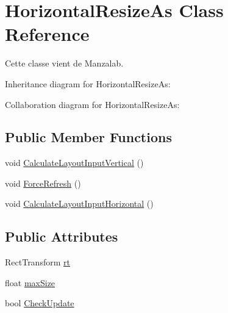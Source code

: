 \hypertarget{class_horizontal_resize_as}{}\section{Horizontal\+Resize\+As Class Reference}
\label{class_horizontal_resize_as}


Cette classe vient de Manzalab.  




Inheritance diagram for Horizontal\+Resize\+As\+:


Collaboration diagram for Horizontal\+Resize\+As\+:
\subsection*{Public Member Functions}
\begin{DoxyCompactItemize}
\item 
void \hyperlink{class_horizontal_resize_as_aaaa4fee66259a708c39d0dfed83be011}{Calculate\+Layout\+Input\+Vertical} ()
\item 
void \hyperlink{class_horizontal_resize_as_a1ffc4557eaffeea58548435876a0a0b5}{Force\+Refresh} ()
\item 
void \hyperlink{class_horizontal_resize_as_aad66debc7373d6813f95448b92acbc80}{Calculate\+Layout\+Input\+Horizontal} ()
\end{DoxyCompactItemize}
\subsection*{Public Attributes}
\begin{DoxyCompactItemize}
\item 
Rect\+Transform \hyperlink{class_horizontal_resize_as_a0a1a352352274ba0e244aeee3fc5b3bc}{rt}
\item 
float \hyperlink{class_horizontal_resize_as_ac152bd9e6d40a63113fb997aabafd37a}{max\+Size}
\item 
bool \hyperlink{class_horizontal_resize_as_af53e21afe8da9fc50ef55a974bd2fa0b}{Check\+Update}
\end{DoxyCompactItemize}
